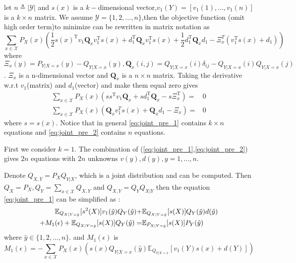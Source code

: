 \documentclass{article}
\def\T{\mathrm{T}}
\def\E{\mathbb{E}}
\begin{document}
let $n\triangleq |\mathcal{Y}|$ and $s(x)$ is a $k-$dimensional vector,$v_1(Y)=[v_1(1),\dots,v_1(n)]$ is a $k\times n$ matrix.
We assume $\mathcal{Y}=\{1,2,\dots,n\}$,then the objective function (omit high order term)to minimize can be rewritten in matrix notation as
\begin{equation}\label{eq:min}
\sum_{x\in \mathcal{X}} P_X(x)\left(\frac{1}{2}s(x)^\T v_1 \bm{Q}_x v_1^\T s(x) +d_1^\T \bm{Q}_x v_1^\T s(x)+\frac{1}{2}d_1^\T \bm{Q}_x d_1-\Xi_x^T (v_1^\T s(x)+d_1)\right)
\end{equation}
where $\Xi_x(y)=P_{Y|X=x}(y)-Q_{Y|X=x}(y),\bm{Q}_x(i,j)=Q_{Y|X=x}(i)\delta_{ij}-Q_{Y|X=x}(i)Q_{Y|X=x}(j)$.
$\Xi_x$ is a n-dimensional vector and $\bm{Q}_x$ is a $n\times n$ matrix.
Taking the derivative w.r.t $v_1$(matrix) and $d_1$(vector) and make them equal zero gives
\begin{align}
\sum_{x\in \mathcal{X}} P_X(x)\left(ss^\T v_1 \bm{Q}_x+sd_1^\T \bm{Q}_x-s\Xi_x^\T\right) = & 0 \label{eq:joint_pre_1}\\
\sum_{x\in \mathcal{X}} P_X(x)\left(\bm{Q}_x v_1^Ts(x)+ \bm{Q}_x d_1-\Xi_x\right)=& 0\label{eq:joint_pre_2}
\end{align}
where $s=s(x)$.
Notice that in general \eqref{eq:joint_pre_1} contains $k\times n$ equations and \eqref{eq:joint_pre_2} contains $n$ equations.



First we consider $k=1$. The combination of (\ref{eq:joint_pre_1},\ref{eq:joint_pre_2}) gives $2n$ equations with $2n$ unknowns $v(y),d(y),y=1,\dots,n$.

Denote $Q_{X,Y}=P_X Q_{Y|X}$, which is a joint distribution and can be computed.
Then $Q_{X}=P_X,Q_{Y}=\sum_{x\in \mathcal{X}}Q_{X,Y}$ and $Q_{X,Y}=Q_Y Q_{X|Y}$
 then the equation \eqref{eq:joint_pre_1} can be simplified as :
\begin{align}\notag
\E_{Q_{X|Y=\hat{y}}}[s^2(X)]v_1(\hat{y})Q_Y(\hat{y})+&\E_{Q_{X|Y=\hat{y}}}[s(X)]Q_Y(\hat{y})d(\hat{y}) \\
+M_1(\epsilon)+\E_{Q_{X|Y=\hat{y}}}[s(X)]Q_Y(\hat{y})=& \E_{P_{X|Y=\hat{y}}}[s(X)]P_Y(\hat{y})\label{eq:joint_simplify_1}
\end{align}
where $\hat{y}\in \{1,2,\dots,n\}$. and $M_1(\epsilon)$ is
$$
M_1(\epsilon)=-\sum_{x\in \mathcal{X}}P_X(x)\left(s(x)Q_{Y|X=x}(\hat{y})\E_{Q_{Y|X=x}}[v_1(Y)s(x)+d(Y)]\right)
$$
\end{document}
